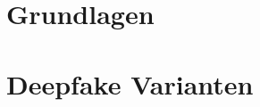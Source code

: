 % 
\chapter{Grundlagen}\label{ch:grundlagen}




\chapter{Deepfake Varianten}\label{ch:deepfake-varianten}
